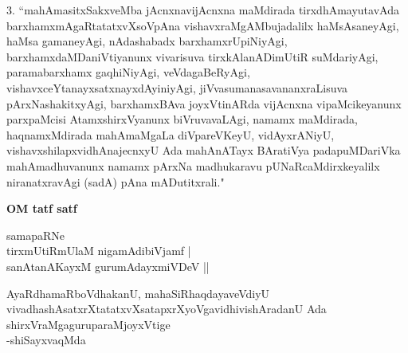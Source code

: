 \begin{artha}
3. ``mahAmasitxSakxveMba jAcnxnavijAcnxna maMdirada tirxdhAmayutavAda barxhamx\-mAgaR\-tatatxvXsoVpAna vishavx\-raMgAMbujadalilx haMsAsaneyAgi, haMsa gamaneyAgi, nAdashabadx barxhamxrUpiNiyAgi, barxhamxdaMDaniVtiyanunx vivarisuva tirxkAlanADimUtiR suMdari\-yAgi, paramabarxhamx gaqhiNiyAgi, veVdagaBeRyAgi, vishavx\-ceYtanayx\-satxnayxdAyiniyAgi, jiVvasumanasavananxraLisuva pArxNashakitxyAgi, barxhamxBAva joyxVtinARda vijAcnxna vipaM\-cike\-yanunx parxpaMcisi AtamxshirxVyanunx biVruvavaLAgi, namamx maMdirada, haqnamxMdirada mahAmaMgaLa diVpa\-reV\-KeyU, vidAyxrANiyU, vishavxshilapxvidhAnajecnxyU Ada mahA\-nATayx BAratiVya padapuMDariVka mahAmadhu\-vanunx namamx pArxNa madhukaravu pUNaRcaMdirxkeyalilx niranatxravAgi (sadA) pAna mADutitxrali."
\end{artha}




\begin{center}
{\bfseries{OM tatf satf}}
\end{center}

\newpage

\thispagestyle{empty}
\begin{center}
{\large samapaRNe\\
tirxmUtiRmUlaM nigamAdibiVjamf |\\
sanAtanAKayxM gurumAdayxmiVDeV ||

\medskip
AyaRdhamaRboVdhakanU, mahaSiRhaqdayaveVdiyU\\
vivadhashAsatxrXtatatxvXsatapxrXyoVgavidhivishAradanU Ada\\
shirxVraMgaguruparaMjoyxVtige\\
\hfill{-shiSayxvaqMda}}
\end{center}
